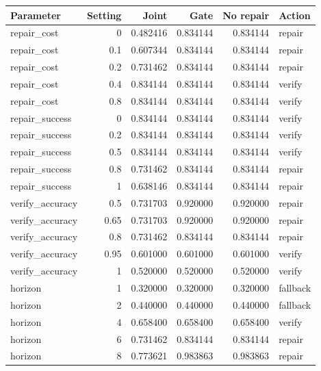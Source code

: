 \begin{tabular}{lrrrrl}
\toprule
Parameter & Setting & Joint & Gate & No repair & Action\\
\midrule
repair\_cost & 0 & 0.482416 & 0.834144 & 0.834144 & repair\\
repair\_cost & 0.1 & 0.607344 & 0.834144 & 0.834144 & repair\\
repair\_cost & 0.2 & 0.731462 & 0.834144 & 0.834144 & repair\\
repair\_cost & 0.4 & 0.834144 & 0.834144 & 0.834144 & verify\\
repair\_cost & 0.8 & 0.834144 & 0.834144 & 0.834144 & verify\\
repair\_success & 0 & 0.834144 & 0.834144 & 0.834144 & verify\\
repair\_success & 0.2 & 0.834144 & 0.834144 & 0.834144 & verify\\
repair\_success & 0.5 & 0.834144 & 0.834144 & 0.834144 & verify\\
repair\_success & 0.8 & 0.731462 & 0.834144 & 0.834144 & repair\\
repair\_success & 1 & 0.638146 & 0.834144 & 0.834144 & repair\\
verify\_accuracy & 0.5 & 0.731703 & 0.920000 & 0.920000 & repair\\
verify\_accuracy & 0.65 & 0.731703 & 0.920000 & 0.920000 & repair\\
verify\_accuracy & 0.8 & 0.731462 & 0.834144 & 0.834144 & repair\\
verify\_accuracy & 0.95 & 0.601000 & 0.601000 & 0.601000 & verify\\
verify\_accuracy & 1 & 0.520000 & 0.520000 & 0.520000 & verify\\
horizon & 1 & 0.320000 & 0.320000 & 0.320000 & fallback\\
horizon & 2 & 0.440000 & 0.440000 & 0.440000 & fallback\\
horizon & 4 & 0.658400 & 0.658400 & 0.658400 & verify\\
horizon & 6 & 0.731462 & 0.834144 & 0.834144 & repair\\
horizon & 8 & 0.773621 & 0.983863 & 0.983863 & repair\\
\bottomrule
\end{tabular}
